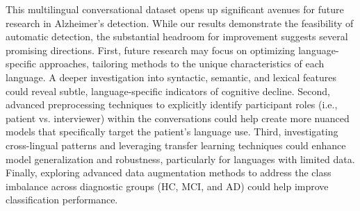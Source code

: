 This multilingual conversational dataset opens up significant avenues for future research in Alzheimer's detection. While our results demonstrate the feasibility of automatic detection, the substantial headroom for improvement suggests several promising directions.
First, future research may focus on optimizing language-specific approaches, tailoring methods to the unique characteristics of each language. A deeper investigation into syntactic, semantic, and lexical features could reveal subtle, language-specific indicators of cognitive decline. Second, advanced preprocessing techniques to explicitly identify participant roles (i.e., patient vs. interviewer) within the conversations could help create more nuanced models that specifically target the patient's language use.
Third, investigating cross-lingual patterns and leveraging transfer learning techniques could enhance model generalization and robustness, particularly for languages with limited data. Finally, exploring advanced data augmentation methods to address the class imbalance across diagnostic groups (HC, MCI, and AD) could help improve classification performance.
